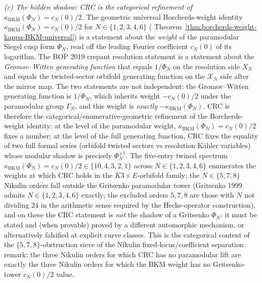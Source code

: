 \begin{remark}
\emph{\textup{(c)} The hidden shadow: CRC is the categorical
refinement of $\kappa_{\mathrm{BKM}}(\Phi_N)=c_N(0)/2$.} The
geometric universal Borcherds-weight identity
$\kappa_{\mathrm{BKM}}(\Phi_N)=c_N(0)/2$ for $N\in\{1,2,3,4,6\}$
(\cite{VolI}
Theorem~\ref{thm:borcherds-weight-kappa-BKM-universal}) is a
statement about the \emph{weight} of the paramodular Siegel cusp form
$\Phi_N$, read off the leading Fourier coefficient
$c_N(0)$ of its logarithm. The BOP 2019 crepant resolution statement
is a statement about the \emph{Gromov--Witten generating function}
that equals $1/\Phi_N$ on the resolution side $X_N$ and equals the
twisted-sector orbifold generating function on the $\mathcal X_N$
side after the mirror map. The two statements are not independent:
the Gromov--Witten generating function is $1/\Phi_N$, which inherits
weight $-c_N(0)/2$ under the paramodular group $\Gamma_N$, and this
weight is \emph{exactly} $-\kappa_{\mathrm{BKM}}(\Phi_N)$. CRC is
therefore the categorical/enumerative-geometric refinement of the
Borcherds-weight identity: at the level of the paramodular weight,
$\kappa_{\mathrm{BKM}}(\Phi_N)=c_N(0)/2$ fixes a number; at the level
of the full generating function, CRC fixes the equality of two
full formal series (orbifold twisted sectors vs resolution K\"ahler
variables) whose modular shadow is precisely $\Phi_N^{\pm 1}$. The
five-entry twined spectrum
$\kappa_{\mathrm{BKM}}(\Phi_N)=c_N(0)/2\in\{10,4,3,2,1\}$ across
$N\in\{1,2,3,4,6\}$ enumerates the weights at which CRC holds in the
$K3\times E$-orbifold family; the $N\in\{5,7,8\}$ Nikulin orders
fall outside the Gritsenko paramodular tower (Gritsenko 1999 admits
$N\in\{1,2,3,4,6\}$ exactly; the excluded orders $5,7,8$ are those
with $N$ not dividing $24$ in the arithmetic sense required by the
Hecke-operator construction), and on these the CRC statement is
\emph{not} the shadow of a Gritsenko $\Phi_N$: it must be stated and
(when provable) proved by a different automorphic mechanism, or
alternatively falsified at explicit curve classes. This is the
categorical content of the $\{5,7,8\}$-obstruction sieve of
the Nikulin fixed-locus/coefficient separation remark:
the three Nikulin orders for which CRC has no paramodular lift are
exactly the three Nikulin orders for which the BKM weight has no
Gritsenko-tower $c_N(0)/2$ value.


\end{remark}
